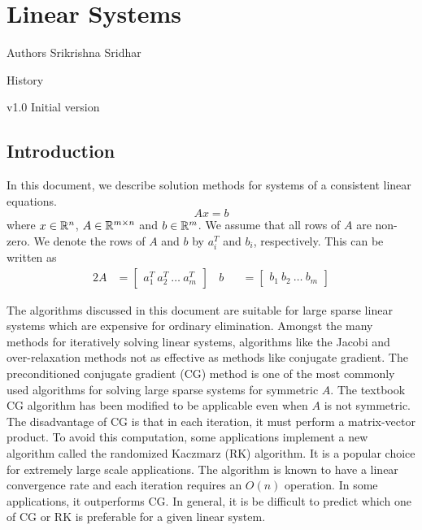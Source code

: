\chapter[Linear Systems]{Linear Systems}
\begin{moduleinfo}
\item[Authors] {Srikrishna Sridhar}
\item[History]
	\begin{modulehistory}
		\item[v1.0] Initial version
	\end{modulehistory}
\end{moduleinfo}

\section{Introduction}\label{sec:intro}
In this document, we describe solution methods for systems of a consistent
linear equations.
\begin{equation}
  \label{eq:linear_system}
  Ax = b
\end{equation}
where $x \in \mathbb{R}^{n}$, $A \in \mathbb{R}^{m \times n}$ and $b \in \mathbb{R}^{m}$. We assume
that all rows of $A$ are non-zero. We denote the rows of $A$ and $b$
by $a^T_i$ and $b_i$, respectively. This can be written
as
\begin{alignat}{2}
A &= \begin{bmatrix} a^T_1 \  a^T_2  \  \ldots \  a^T_m   \end{bmatrix} \ \ \ \
b &&= \begin{bmatrix} b_1  \  b_2   \ \ldots \  b_m   \end{bmatrix}
\end{alignat}

The algorithms discussed in this document are suitable for large sparse
linear systems which are expensive for ordinary elimination. Amongst the many methods for
iteratively solving linear systems, algorithms like the Jacobi and over-relaxation
methods not as effective as methods like conjugate gradient. The preconditioned
conjugate gradient (CG) method is one of the most commonly used algorithms for
solving large sparse systems for symmetric $A$. The textbook CG algorithm has been modified
to be applicable even when $A$ is not symmetric. The disadvantage of CG is that
in each iteration, it must perform a matrix-vector product. To avoid this computation,
some applications implement a new algorithm called the randomized Kaczmarz (RK)
algorithm. It is a popular choice for extremely large scale applications.
The algorithm is known to have a linear convergence rate and each iteration
requires an $O(n)$ operation. In some applications, it outperforms CG. In
general, it is be difficult to predict which one of CG or RK is preferable
for a given linear system.

